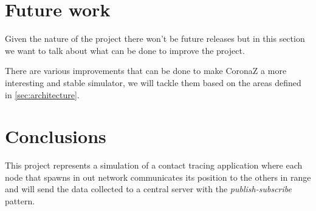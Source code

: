 \documentclass[conference]{IEEEtran}
\begin{document}
\section{Future work}\label{sec:future_work}

	Given the nature of the project there won't be future releases but in this section we want to talk about what can be done to improve the project.
	
	There are various improvements that can be done to make CoronaZ a more interesting and stable simulator, we will tackle them based on the areas defined in \ref{sec:architecture}.
	
\section{Conclusions}\label{sec:conclusions}

	This project represents a simulation of a contact tracing application where each node that spawns in out network communicates its position to the others in range and will send the data collected to a central server with the \textit{publish-subscribe} pattern.
\end{document}
